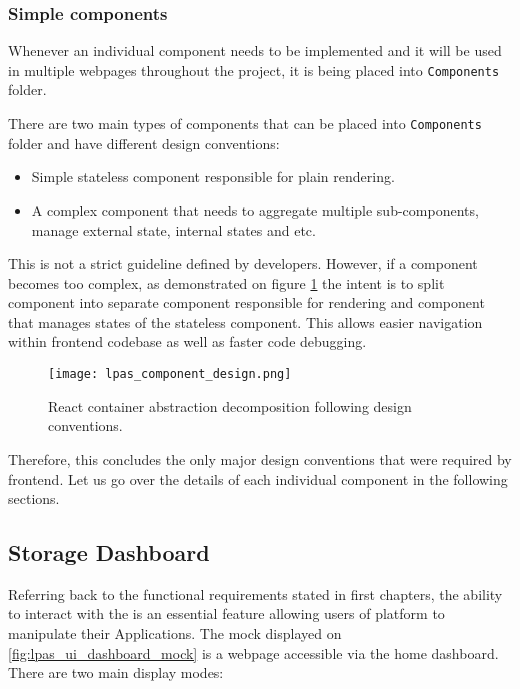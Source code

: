 \subsubsection{Simple components}

Whenever an individual component needs to be implemented and it will be used in multiple webpages throughout the project, it is being placed into \texttt{Components} folder.

There are two main types of components that can be placed into \texttt{Components} folder and have different design conventions:
\begin{itemize}
	\item Simple stateless component responsible for plain rendering.
	\item A complex component that needs to aggregate multiple sub-components, manage external state, internal states and etc.
\end{itemize}


This is not a strict guideline defined by \lpa{} developers. However, if a component becomes too complex, as demonstrated on figure \ref{fig:lpas_component_design} the intent is to split component into separate component responsible for rendering and component that manages states of the stateless component. This allows easier navigation within frontend codebase as well as faster code debugging. 

\begin{figure}[h]
\centering
\texttt{[image: lpas\_component\_design.png]}
\caption{React container abstraction decomposition following \lpas{} design conventions.}
\label{fig:lpas_component_design}
\end{figure}

Therefore, this concludes the only major design conventions that were required by \lpa{} frontend. Let us go over the details of each individual component in the following sections.

\subsection{Storage Dashboard}

Referring back to the functional requirements stated in first chapters, the ability to interact with the \lpas{} is an essential feature allowing users of \lpa{} platform to manipulate their Applications. The mock displayed on \ref{fig:lpas_ui_dashboard_mock} is a webpage accessible via the home dashboard. There are two main display modes:

